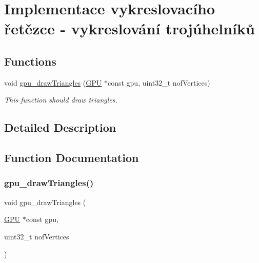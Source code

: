 \hypertarget{group__gpu__side}{}\section{Implementace vykreslovacího řetězce -\/ vykreslování trojúhelníků}
\label{group__gpu__side}
\subsection*{Functions}
\begin{DoxyCompactItemize}
\item 
void \hyperlink{group__gpu__side_gad786da6785f12139855c4484767a45fb}{gpu\+\_\+draw\+Triangles} (\hyperlink{structGPU}{G\+PU} $\ast$const gpu, uint32\+\_\+t nof\+Vertices)
\begin{DoxyCompactList}\small\item\em This function should draw triangles. \end{DoxyCompactList}\end{DoxyCompactItemize}


\subsection{Detailed Description}


\subsection{Function Documentation}
\mbox{\label{group__gpu__side_gad786da6785f12139855c4484767a45fb}} 
\subsubsection{\texorpdfstring{gpu\+\_\+draw\+Triangles()}{gpu\_drawTriangles()}}
{\footnotesize\ttfamily void gpu\+\_\+draw\+Triangles (\begin{DoxyParamCaption}\item[{\hyperlink{structGPU}{G\+PU} $\ast$const}]{gpu,  }\item[{uint32\+\_\+t}]{nof\+Vertices }\end{DoxyParamCaption})}



